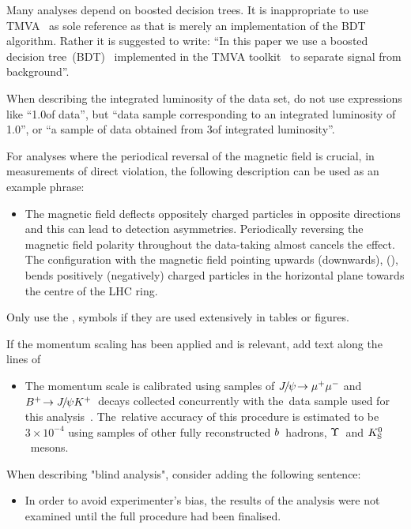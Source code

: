 Many analyses depend on boosted decision trees. It is inappropriate to
use TMVA~\cite{Hocker:2007ht,*TMVA4} as sole reference as that is
merely an implementation of the BDT algorithm.
Rather it is suggested to write: ``In this paper we use a 
boosted decision tree~(BDT)~\cite{Breiman,AdaBoost} implemented in the TMVA
toolkit~\cite{Hocker:2007ht,*TMVA4} to separate signal from background''. 

When describing the integrated luminosity of the data set, do not use
expressions like ``1.0\invfb of data'', but \eg 
``data sample corresponding to an integrated luminosity of 1.0\invfb'', 
or ``a sample of data obtained from 3\invfb of integrated luminosity''. 

For analyses where the periodical reversal of the magnetic field is crucial, 
\eg in measurements of direct \CP violation, the following description can be
used as an example phrase: 
\begin{itemize} \item  The magnetic field deflects oppositely charged particles in opposite
directions and this can lead to detection asymmetries. Periodically
reversing the magnetic field polarity throughout the data-taking almost cancels
the effect. The configuration with the magnetic field pointing upwards (downwards), 
\MagUp (\MagDown), bends positively (negatively) charged particles
in the horizontal plane towards the centre of the LHC ring.\end{itemize}
Only use the \MagUp, \MagDown symbols if they are used extensively in tables or figures.

If the momentum scaling has been applied and is relevant, add text along the lines of
\begin{itemize} \item The momentum scale is calibrated using samples of ${{J\mskip -3mu/\mskip -2mu\psi}}\!\rightarrow {\ensuremath{\mu^+\mu^-}}$ 
and ${{B}^+}\!\rightarrow {\ensuremath{{J\mskip -3mu/\mskip -2mu\psi}}}{\ensuremath{{K}^+}}$~decays collected concurrently
with the~data sample used for this analysis~\cite{LHCb-PAPER-2012-048,LHCb-PAPER-2013-011}.
The~relative accuracy of this
procedure is estimated to be $3 \times 10^{-4}$ using samples of other
fully reconstructed ${b}$~hadrons, $\Upsilon$~and
${{K}^0_{\mathrm{S}}}$~mesons. \end{itemize}

When describing  "blind analysis", consider adding the following sentence:
\begin{itemize} 
\item In order to avoid experimenter's bias, the results of the analysis were
not examined until the full procedure had been finalised. 
\end{itemize}

